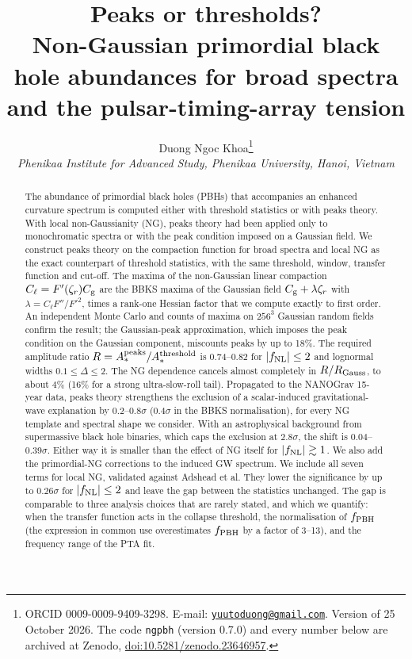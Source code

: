 \documentclass[11pt,a4paper]{article}
\title{\textbf{Peaks or thresholds?}\\[6pt]
\Large Non-Gaussian primordial black hole abundances for broad spectra\\
and the pulsar-timing-array tension}
\author{Duong Ngoc Khoa\thanks{ORCID 0009-0009-9409-3298. E-mail:
\href{mailto:yuutoduong@gmail.com}{\texttt{yuutoduong@gmail.com}}. Version of 25 October 2026. The
code \texttt{ngpbh} (version 0.7.0) and every number below are archived at Zenodo,
\href{https://doi.org/10.5281/zenodo.23646957}{doi:10.5281/zenodo.23646957}.}\\[4pt]
{\normalsize\itshape Phenikaa Institute for Advanced Study, Phenikaa University, Hanoi, Vietnam}}
\date{}
\newcommand{\Cg}{C_{\rm g}}
\newcommand{\Cl}{C_{\ell}}
\newcommand{\zr}{\zeta_r}
\newcommand{\fnl}{f_{\rm NL}}
\newcommand{\fpbh}{f_{\rm PBH}}
\begin{document}
\maketitle

\begin{abstract}
The abundance of primordial black holes (PBHs) that accompanies an enhanced curvature spectrum
is computed either with threshold statistics or with peaks theory. With local
non-Gaussianity (NG), peaks theory had been applied only to monochromatic spectra or with the
peak condition imposed on a Gaussian field. We construct peaks theory on the compaction
function for broad spectra and local NG as the exact counterpart of threshold statistics, with
the same threshold, window, transfer function and cut-off. The maxima of the non-Gaussian linear
compaction $\Cl=F'(\zr)\Cg$ are the BBKS maxima of the Gaussian field $\Cg+\lambda\zr$ with
$\lambda=\Cl F''/F'^2$, times a rank-one Hessian factor that we compute exactly to first order.
An independent Monte Carlo and counts of maxima on $256^3$ Gaussian random fields confirm the
result; the Gaussian-peak approximation, which imposes the peak condition on the Gaussian
component, miscounts peaks by up to 18\%. The required
amplitude ratio $R=A_*^{\rm peaks}/A_*^{\rm threshold}$ is 0.74--0.82 for $|\fnl|\le2$ and
lognormal widths $0.1\le\Delta\le2$. The NG dependence cancels almost completely in
$R/R_{\rm Gauss}$, to about 4\% (16\% for a strong ultra-slow-roll tail). Propagated to
the NANOGrav 15-year data, peaks theory strengthens the exclusion of a scalar-induced
gravitational-wave explanation by 0.2--0.8$\sigma$ (0.4$\sigma$ in the BBKS normalisation), for
every NG template and spectral shape we consider. With an astrophysical background from
supermassive black hole binaries, which caps the exclusion at $2.8\sigma$, the shift is
0.04--0.39$\sigma$. Either way it is smaller than the effect of NG itself
for $|\fnl|\gtrsim1$. We also add the primordial-NG corrections to the induced GW spectrum. We
include all seven terms for local NG, validated against Adshead et al. They lower the significance
by up to $0.26\sigma$ for $|\fnl|\le2$ and leave the gap between the statistics unchanged. The
gap is comparable to three analysis choices that are rarely stated, and which we quantify: when
the transfer function acts in the collapse threshold, the normalisation of $\fpbh$ (the
expression in common use overestimates $\fpbh$ by a factor of 3--13), and the frequency range of
the PTA fit.
\end{abstract}
\end{document}
